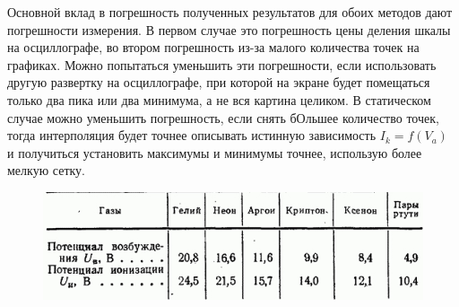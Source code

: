 \documentclass[a4paper, 12pt]{article}%
\begin{document}
	Основной вклад в погрешность полученных результатов для обоих методов дают погрешности измерения. В первом случае это погрешность цены деления шкалы на осциллографе, во втором погрешность из-за малого количества точек на графиках. Можно попытаться уменьшить эти погрешности, если использовать другую развертку на осциллографе, при которой на экране будет помещаться только два пика или два минимума, а не вся картина целиком. В статическом случае можно уменьшить погрешность, если снять бОльшее количество точек, тогда интерполяция будет точнее описывать истинную зависимость  $I_k = f(V_a)$ и получиться установить максимумы и минимумы точнее, использую более мелкую сетку.
	
	\begin{figure}[H]
		\centering
		\includegraphics[width= 0.8 \linewidth]{E_ion}
		\caption{}
	\end{figure}
 
 
 
\end{document}
